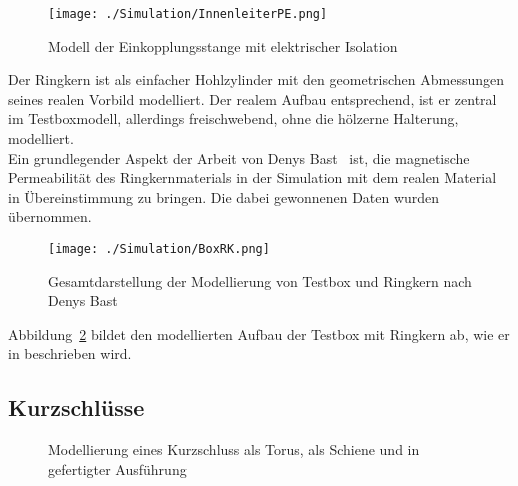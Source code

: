            \begin{figure}[htb]
                \centering
                \texttt{[image: ./Simulation/InnenleiterPE.png]}
                \caption{Modell der Einkopplungsstange mit elektrischer Isolation}
                \label{fig:InnenleiterCST}
            \end{figure}
        
        Der Ringkern ist als einfacher Hohlzylinder mit den geometrischen Abmessungen seines realen Vorbild modelliert. Der realem Aufbau entsprechend, ist er zentral im Testboxmodell, allerdings freischwebend, ohne die hölzerne Halterung, modelliert.\\
        Ein grundlegender Aspekt der Arbeit von Denys Bast~\cite{bast2017ba} ist, die magnetische Permeabilität des Ringkernmaterials in der Simulation mit dem realen Material in Übereinstimmung zu bringen. Die dabei gewonnenen Daten wurden übernommen.
        
            \begin{figure}[htb]
                \centering
                \texttt{[image: ./Simulation/BoxRK.png]}
                \caption{Gesamtdarstellung der Modellierung von Testbox und Ringkern nach Denys Bast~\cite{bast2017ba}}
                \label{fig:BoxRKCST}
            \end{figure}
        
        Abbildung~\ref{fig:BoxRKCST} bildet den modellierten Aufbau der Testbox mit Ringkern ab, wie er in \cite{bast2017ba} beschrieben wird.

        \subsection{Kurzschlüsse}
        
            \begin{figure}[htb]
                \centering
                \hspace{0.01\textwidth}
                \hspace{0.01\textwidth}
                \caption{Modellierung eines Kurzschluss \protect{} als Torus, \protect{} als Schiene und \protect{} in gefertigter Ausführung}
                \label{fig:KSCST}
            \end{figure}
        
